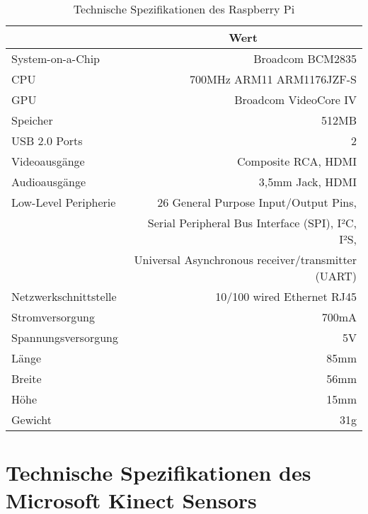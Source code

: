 \begin{table}[ht]
\caption{Technische Spezifikationen des Raspberry Pi}
\begin{center}
\begin{tabular}{|l|r|}
\hline
\rowcolor{lightgray} \multicolumn{1}{|c|}{\textbf{Spezifikation}} & \multicolumn{1}{|c|}{\textbf{Wert}}\\
\hline
System-on-a-Chip & Broadcom BCM2835\\
\hline
CPU & 700MHz ARM11 ARM1176JZF-S\\
\hline
GPU & Broadcom VideoCore IV\\
\hline
Speicher & 512MB\\
\hline
USB 2.0 Ports & 2\\
\hline
Videoausgänge & Composite RCA, HDMI\\
\hline
Audioausgänge & 3,5mm Jack, HDMI\\
\hline
Low-Level Peripherie & 26 General Purpose Input/Output Pins,\\
& Serial Peripheral Bus Interface (SPI), I²C, I²S,\\
& Universal Asynchronous receiver/transmitter (UART)\\
\hline
Netzwerkschnittstelle & 10/100 wired Ethernet RJ45\\
\hline
Stromversorgung & 700mA\\
\hline
Spannungsversorgung & 5V\\
\hline
Länge & 85mm\\
\hline
Breite & 56mm\\
\hline
Höhe & 15mm\\
\hline
Gewicht & 31g\\
\hline
\end{tabular}
\end{center}
\label{tab:raspberry}
\end{table}

\clearpage{}

\section{Technische Spezifikationen des Microsoft Kinect Sensors}
\label{app:kinect}

\clearpage{}

